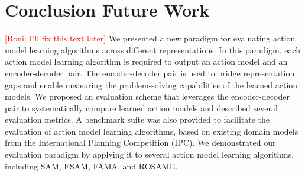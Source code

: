 \documentclass{article}
\theoremstyle{definition}
\theoremstyle{remark}
\newcommand{\roni}[1]{{\textcolor{red}{[Roni: #1]}}}
\begin{document}
\section{Conclusion Future Work}
\roni{I'll fix this text later}
We presented a new paradigm for evaluating action 
model learning algorithms across different representations. In this paradigm, each action model learning algorithm is required to output an action model and an encoder-decoder pair. The encoder-decoder pair is used to bridge representation gaps and enable measuring the problem-solving capabilities of the learned action models. We proposed an evaluation scheme that leverages the encoder-decoder pair to systematically compare learned action models and described several evaluation metrics. A benchmark suite was also provided to facilitate the evaluation of action model learning algorithms, based on existing domain models from the International Planning Competition (IPC). We demonstrated our evaluation paradigm by applying it to several action model learning algorithms, including SAM, ESAM, FAMA, and ROSAME.




 
\end{document}
